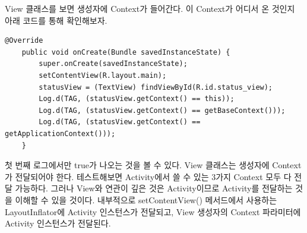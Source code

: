 View 클래스를 보면 생성자에 Context가 들어간다. 이 Context가 어디서 온 것인지 아래 코드를 통해 확인해보자.
\begin{lstlisting}[frame=single]
    @Override
    public void onCreate(Bundle savedInstanceState) {
        super.onCreate(savedInstanceState);
        setContentView(R.layout.main);
        statusView = (TextView) findViewById(R.id.status_view);
        Log.d(TAG, (statusView.getContext() == this));
        Log.d(TAG, (statusView.getContext() == getBaseContext()));
        Log.d(TAG, (statusView.getContext() == getApplicationContext()));
    }
\end{lstlisting}
첫 번째 로그에서만 true가 나오는 것을 볼 수 있다. View 클래스는 생성자에 Context가 전달되어야 한다. 
테스트해보면 Activity에서 쓸 수 있는 3가지 Context 모두 다 전달 가능하다. 
그러나 View와 연관이 깊은 것은 Activity이므로 Activity를 전달하는 것을 이해할 수 있을 것이다.
내부적으로 setContentView() 메서드에서 사용하는 LayoutInflator에 Activity 인스턴스가 전달되고, View 생성자의 Context 파라미터에 Activity 인스턴스가 전달된다. 
